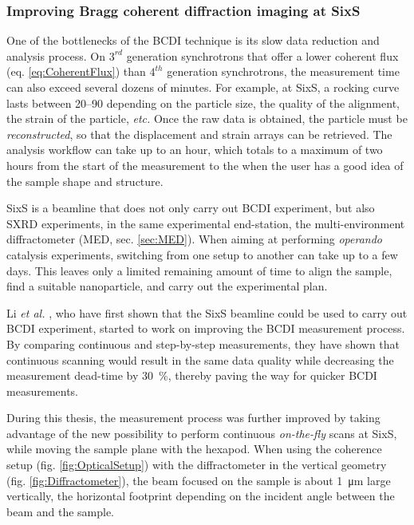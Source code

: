 \subsubsection{Improving Bragg coherent diffraction imaging at SixS}

One of the bottlenecks of the BCDI technique is its slow data reduction and analysis process.
On $3^{rd}$ generation synchrotrons that offer a lower coherent flux (eq. \ref{eq:CoherentFlux}) than $4^{th}$ generation synchrotrons, the measurement time can also exceed several dozens of minutes.
For example, at SixS, a rocking curve lasts between \qtyrange{20}{90}{\min} depending on the particle size, the quality of the alignment, the strain of the particle, \textit{etc.}
Once the raw data is obtained, the particle must be \textit{reconstructed}, so that the displacement and strain arrays can be retrieved.
The analysis workflow can take up to an hour, which totals to a maximum of two hours from the start of the measurement to the when the user has a good idea of the sample shape and structure.

SixS is a beamline that does not only carry out BCDI experiment, but also SXRD experiments, in the same experimental end-station, the multi-environment diffractometer (MED, sec. \ref{sec:MED}).
When aiming at performing \textit{operando} catalysis experiments, switching from one setup to another can take up to a few days.
This leaves only a limited remaining amount of time to align the sample, find a suitable nanoparticle, and carry out the experimental plan.

Li \textit{et al.} \parencite*{Li2020}, who have first shown that the SixS beamline could be used to carry out BCDI experiment, started to work on improving the BCDI measurement process.
By comparing continuous and step-by-step measurements, they have shown that continuous scanning would result in the same data quality while decreasing the measurement dead-time by \qty{30}{\percent}, thereby paving the way for quicker BCDI measurements.

During this thesis, the measurement process was further improved by taking advantage of the new possibility to perform continuous \textit{on-the-fly} scans at SixS, while moving the sample plane with the hexapod.
When using the coherence setup (fig. \ref{fig:OpticalSetup}) with the diffractometer in the vertical geometry (fig. \ref{fig:Diffractometer}), the beam focused on the sample is about \qty{1}{\um} large vertically, the horizontal footprint depending on the incident angle between the beam and the sample.


